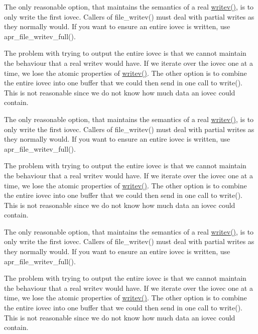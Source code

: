 The only reasonable option, that maintains the semantics of a real \hyperlink{apr__arch__os2calls_8h_a3d0f3996136a9b5ab46431c60c746efd}{writev()}, is to only write the first iovec. Callers of file\+\_\+writev() must deal with partial writes as they normally would. If you want to ensure an entire iovec is written, use apr\+\_\+file\+\_\+writev\+\_\+full().

The problem with trying to output the entire iovec is that we cannot maintain the behaviour that a real writev would have. If we iterate over the iovec one at a time, we lose the atomic properties of \hyperlink{apr__arch__os2calls_8h_a3d0f3996136a9b5ab46431c60c746efd}{writev()}. The other option is to combine the entire iovec into one buffer that we could then send in one call to write(). This is not reasonable since we do not know how much data an iovec could contain.

The only reasonable option, that maintains the semantics of a real \hyperlink{apr__arch__os2calls_8h_a3d0f3996136a9b5ab46431c60c746efd}{writev()}, is to only write the first iovec. Callers of file\+\_\+writev() must deal with partial writes as they normally would. If you want to ensure an entire iovec is written, use apr\+\_\+file\+\_\+writev\+\_\+full().

The problem with trying to output the entire iovec is that we cannot maintain the behaviour that a real writev would have. If we iterate over the iovec one at a time, we lose the atomic properties of \hyperlink{apr__arch__os2calls_8h_a3d0f3996136a9b5ab46431c60c746efd}{writev()}. The other option is to combine the entire iovec into one buffer that we could then send in one call to write(). This is not reasonable since we do not know how much data an iovec could contain.

The only reasonable option, that maintains the semantics of a real \hyperlink{apr__arch__os2calls_8h_a3d0f3996136a9b5ab46431c60c746efd}{writev()}, is to only write the first iovec. Callers of file\+\_\+writev() must deal with partial writes as they normally would. If you want to ensure an entire iovec is written, use apr\+\_\+file\+\_\+writev\+\_\+full().

The problem with trying to output the entire iovec is that we cannot maintain the behaviour that a real writev would have. If we iterate over the iovec one at a time, we lose the atomic properties of \hyperlink{apr__arch__os2calls_8h_a3d0f3996136a9b5ab46431c60c746efd}{writev()}. The other option is to combine the entire iovec into one buffer that we could then send in one call to write(). This is not reasonable since we do not know how much data an iovec could contain.

